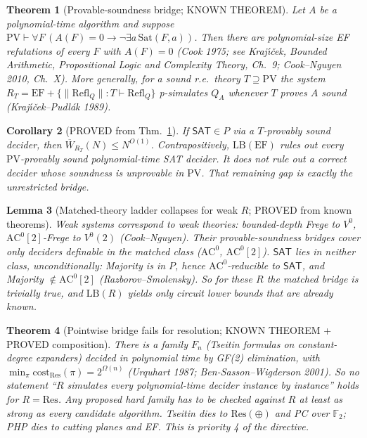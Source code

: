 \documentclass[11pt]{article}
\newtheorem{theorem}{Theorem}
\newtheorem{corollary}[theorem]{Corollary}
\newtheorem{lemma}[theorem]{Lemma}
\theoremstyle{definition}
\newcommand{\SAT}{\mathsf{SAT}}
\newcommand{\Wbar}{\overline W}
\begin{document}
\begin{theorem}[Provable-soundness bridge; KNOWN THEOREM]\label{thm:pv}
Let $A$ be a polynomial-time algorithm and suppose
$\mathrm{PV}\vdash\forall F\,(A(F)=0\to\neg\exists a\,\mathrm{Sat}(F,a))$.
Then there are polynomial-size EF refutations of every $F$ with $A(F)=0$ (Cook 1975; see
Kraj\'\i\v{c}ek, \emph{Bounded Arithmetic, Propositional Logic and Complexity Theory},
Ch.~9; Cook--Nguyen 2010, Ch.~X). More generally, for a sound r.e.\ theory
$T\supseteq\mathrm{PV}$ the system $R_T=\mathrm{EF}+\{\|\mathrm{Refl}_Q\|:T\vdash\mathrm{Refl}_Q\}$
p-simulates $Q_A$ whenever $T$ proves $A$ sound (Kraj\'\i\v{c}ek--Pudl\'ak 1989).
\end{theorem}
\begin{corollary}[PROVED from Thm.~\ref{thm:pv}]
If $\SAT\in P$ via a $T$-provably sound decider, then $\Wbar_{R_T}(N)\le N^{O(1)}$.
Contrapositively, $\mathrm{LB}(\mathrm{EF})$ rules out every $\mathrm{PV}$-provably sound
polynomial-time SAT decider. It does \emph{not} rule out a correct decider whose soundness
is unprovable in $\mathrm{PV}$. That remaining gap is exactly the unrestricted bridge.
\end{corollary}

\begin{lemma}[Matched-theory ladder collapses for weak $R$; PROVED from known theorems]
Weak systems correspond to weak theories: bounded-depth Frege to $V^0$, $\mathrm{AC}^0[2]$-Frege
to $V^0(2)$ (Cook--Nguyen). Their provable-soundness bridges cover only deciders definable in
the matched class ($\mathrm{AC}^0$, $\mathrm{AC}^0[2]$). $\SAT$ lies in neither class,
unconditionally: Majority is in $P$, hence $\mathrm{AC}^0$-reducible to $\SAT$, and
Majority $\notin\mathrm{AC}^0[2]$ (Razborov--Smolensky). So for these $R$ the matched
bridge is trivially true, and $\mathrm{LB}(R)$ yields only circuit lower bounds that are
already known.
\end{lemma}

\begin{theorem}[Pointwise bridge fails for resolution; KNOWN THEOREM + PROVED composition]
There is a family $F_n$ (Tseitin formulas on constant-degree expanders) decided in polynomial
time by GF(2) elimination, with $\min_\pi\mathrm{cost}_{\mathrm{Res}}(\pi)=2^{\Omega(n)}$
(Urquhart 1987; Ben-Sasson--Wigderson 2001). So no statement ``$R$ simulates every
polynomial-time decider instance by instance'' holds for $R=\mathrm{Res}$. Any proposed hard
family has to be checked against $R$ at least as strong as every candidate algorithm.
Tseitin dies to $\mathrm{Res}(\oplus)$ and PC over $\mathbb F_2$; PHP dies to cutting planes
and EF. This is priority 4 of the directive.
\end{theorem}
\end{document}
